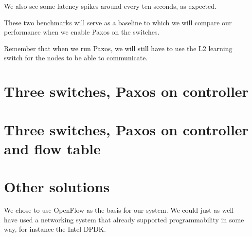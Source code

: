 We also see some latency spikes around every ten seconds, as expected.


These two benchmarks will serve as a baseline to which we will compare our
performance when we enable Paxos on the switches.

Remember that when we run Paxos, we will still have to use the L2 learning
switch for the nodes to be able to communicate.


\section{Three switches, Paxos on controller}


\section{Three switches, Paxos on controller and flow table}


\section{Other solutions}

We chose to use OpenFlow as the basis for our system.
We could just as well have used a networking system that already supported
programmability in some way, for instance the Intel DPDK.


